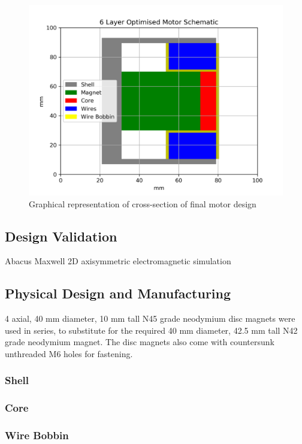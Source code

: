 \documentclass[a4paper,12pt]{article}
\begin{document}
\begin{figure}[h] \label{fg:finalmotor}
	\centering
	\includegraphics[scale=0.5]{finalDesign_layers.png}
	\caption{Graphical representation of cross-section of final motor design}
\end{figure}

\subsection{Design Validation}
Abacus Maxwell 2D axisymmetric electromagnetic simulation

\subsection{Physical Design and Manufacturing}
4 axial, 40 mm diameter, 10 mm tall N45 grade neodymium disc magnets were used in series, to substitute for the required 40 mm diameter, 42.5 mm tall N42 grade neodymium magnet. The disc magnets also come with countersunk unthreaded M6 holes for fastening. 

\subsubsection{Shell}



\subsubsection{Core}

\subsubsection{Wire Bobbin}
\end{document}
